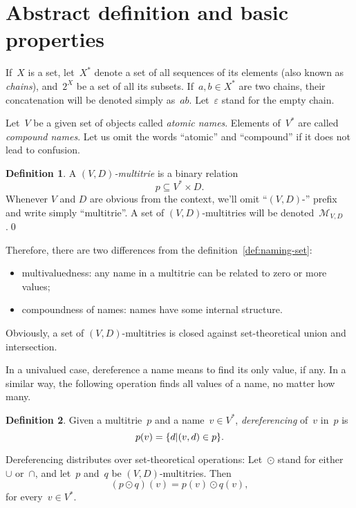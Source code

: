 \documentclass{article}
\theoremstyle{definition}
\newtheorem{Df}{Definition}
\newcommand{\set}[1]{\mathcal{#1}}
\newcommand{\setmt}[2]{\set{M}_{#1,#2}}
\begin{document}
\section{Abstract definition and basic properties}

If~$X$ is a set, let~$X^\ast$ denote a set of all sequences of its elements
(also known as \emph{chains}), and~$2^X$ be a set of all its subsets.
If~$a,b\in X^\ast$ are two chains, their concatenation will be denoted simply
as~$ab$. Let~$\varepsilon$ stand for the empty chain.

Let~$V$ be a given set of objects called \emph{atomic names}. Elements
of~$V^\ast$ are called \emph{compound names}. Let us omit the words ``atomic''
and ``compound'' if it does not lead to confusion.

\begin{Df}\label{def:multitrie-abstract}
A \emph{$(V,D)$-multitrie} is a binary relation
\[
  p \subseteq V^\ast \times D .
\]
Whenever $V$ and $D$ are obvious from the context, we'll omit ``$(V,D)$-''
prefix and write simply ``multitrie''. A set of $(V,D)$-multitries will be
denoted~$\setmt{V}{D}$.\qed
\end{Df}

Therefore, there are two differences from the definition~\ref{def:naming-set}:
\begin{itemize}
\item multivaluedness: any name in a multitrie can be related to zero or more
values;
\item compoundness of names: names have some internal structure.
\end{itemize}

Obviously, a set of $(V,D)$-multitries is closed against set-theoretical union
and intersection.

In a univalued case, dereference a name means to find its only value, if any.
In a similar way, the following operation finds all values of a name, no matter
how many.

\begin{Df}\label{def:dereferencing}
Given a multitrie~$p$ and a name~$v\in V^\ast$, \emph{dereferencing} of~$v$
in~$p$ is
\[
  p(v) = \{ d | (v,d) \in p \} . \qedhere
\]
\end{Df}

Dereferencing distributes over set-theoretical operations:
Let~$\odot$ stand for either~$\cup$ or~$\cap$, and let~$p$ and~$q$ be
$(V,D)$-multitries. Then
\[
  (p\odot q)(v) = p(v) \odot q(v) ,
\]
for every~$v\in V^\ast$.
\end{document}
